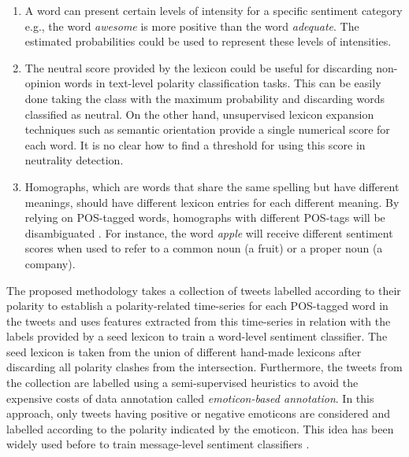 \documentclass{sig-alternate}
\begin{document}
\begin{enumerate}
\item A word can present certain levels of intensity \cite{ThelwallBP12} for a specific sentiment category e.g., the word \emph{awesome} is more positive than the word \emph{adequate}. The estimated probabilities could be used to represent these levels of intensities.

\item  The neutral score provided by the lexicon could be useful for discarding non-opinion words in text-level polarity classification tasks. This can be easily done  taking the class with the maximum probability and discarding words classified as neutral. On the other hand, unsupervised lexicon expansion techniques such as semantic orientation \cite{Turney2002} provide a single numerical score for each word. It is no clear how to find a threshold for using this score in neutrality detection. 

\item   Homographs, which are  words that share the same spelling but have different meanings, should  have different lexicon entries for each different meaning. By relying on POS-tagged words, homographs with different POS-tags will be disambiguated \cite{wilks1998grammar}. For instance, the word \emph{apple}  will receive different sentiment scores when used to refer to a common noun (a fruit) or a proper noun (a company). 

\end{enumerate}


The proposed methodology takes a collection of tweets labelled according to their polarity to establish a polarity-related time-series for each POS-tagged word in the tweets and uses features extracted from this time-series in relation with the labels provided by a seed lexicon to train a word-level sentiment classifier. The seed lexicon is taken from the union of different hand-made lexicons after discarding all polarity clashes from the intersection. Furthermore, the tweets from the collection are labelled using a semi-supervised heuristics to avoid the expensive costs of data annotation called \emph{emoticon-based annotation}. In this approach, only tweets having positive or negative emoticons are considered and labelled according to the polarity indicated by the emoticon. This idea has been widely used before to train message-level sentiment classifiers \cite{bifet2010, go2010, pak2010twitter}.
\end{document}
